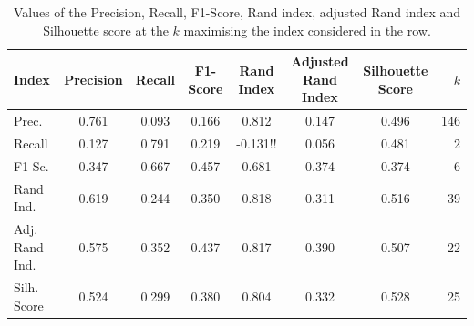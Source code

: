 \documentclass[a4paper]{article}
\begin{document}
	\begin{table}[h!]
		\centering
		\begin{tabular}{l*{6}{c}r}
			Index              & Precision & Recall & F1-Score & Rand Index & Adjusted Rand Index  & Silhouette Score & $k$ \\
			\hline
			Prec. 		& 0.761 & 0.093 & 0.166 & 0.812 & 0.147 & 0.496 & 146  \\
			Recall          & 0.127 & 0.791 & 0.219 & -0.131!! &  0.056 & 0.481 &  2  \\
			F1-Sc.        & 0.347 & 0.667 & 0.457 & 0.681 &  0.374 & 0.374 &  6  \\
			Rand Ind.      & 0.619 & 0.244 & 0.350 & 0.818 &  0.311 & 0.516 &  39  \\
			Adj. Rand Ind. & 0.575 & 0.352 & 0.437 & 0.817 &  0.390 & 0.507 &  22  \\
			Silh. Score & 0.524 & 0.299 & 0.380 & 0.804 &  0.332 & 0.528 &  25  \\
		\end{tabular}
	\caption{Values of the Precision, Recall, F1-Score, Rand index, adjusted Rand index and Silhouette score at the $k$ maximising the index considered in the row.}
	\label{table:kmeans}
	\end{table}
\end{document}
